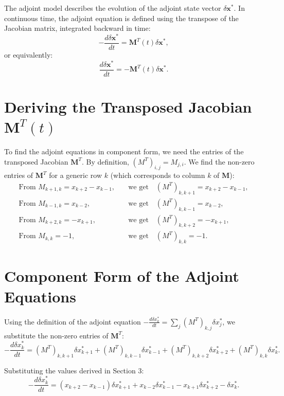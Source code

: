 \documentclass[11pt]{article}
\begin{document}
The adjoint model describes the evolution of the adjoint state vector $\delta \mathbf{x}^*$. In continuous time, the adjoint equation is defined using the transpose of the Jacobian matrix, integrated backward in time:
\begin{equation}
    -\frac{d \delta \mathbf{x}^*}{dt} = \mathbf{M}^T(t) \delta \mathbf{x}^*,
\end{equation}
or equivalently:
\begin{equation}
    \frac{d \delta \mathbf{x}^*}{dt} = -\mathbf{M}^T(t) \delta \mathbf{x}^*.
\end{equation}

\section{Deriving the Transposed Jacobian $\mathbf{M}^T(t)$}

To find the adjoint equations in component form, we need the entries of the transposed Jacobian $\mathbf{M}^T$. By definition, $(M^T)_{i, j} = M_{j, i}$. We find the non-zero entries of $\mathbf{M}^T$ for a generic row $k$ (which corresponds to column $k$ of $\mathbf{M}$):
\begin{align*}
    \text{From } M_{k+1, k} = x_{k+2} - x_{k-1}, \quad &\text{we get} \quad (M^T)_{k, k+1} = x_{k+2} - x_{k-1}, \\
    \text{From } M_{k-1, k} = x_{k-2}, \quad &\text{we get} \quad (M^T)_{k, k-1} = x_{k-2}, \\
    \text{From } M_{k+2, k} = -x_{k+1}, \quad &\text{we get} \quad (M^T)_{k, k+2} = -x_{k+1}, \\
    \text{From } M_{k, k} = -1, \quad &\text{we get} \quad (M^T)_{k, k} = -1.
\end{align*}

\section{Component Form of the Adjoint Equations}

Using the definition of the adjoint equation $-\frac{d \delta x_k^*}{dt} = \sum_j (M^T)_{k, j} \delta x_j^*$, we substitute the non-zero entries of $\mathbf{M}^T$:
\begin{equation}
    -\frac{d \delta x_k^*}{dt} = (M^T)_{k, k+1} \delta x_{k+1}^* + (M^T)_{k, k-1} \delta x_{k-1}^* + (M^T)_{k, k+2} \delta x_{k+2}^* + (M^T)_{k, k} \delta x_k^*.
\end{equation}

Substituting the values derived in Section 3:
\begin{equation}
    -\frac{d \delta x_k^*}{dt} = (x_{k+2} - x_{k-1}) \delta x_{k+1}^* + x_{k-2} \delta x_{k-1}^* - x_{k+1} \delta x_{k+2}^* - \delta x_k^*.
\end{equation}
\end{document}
